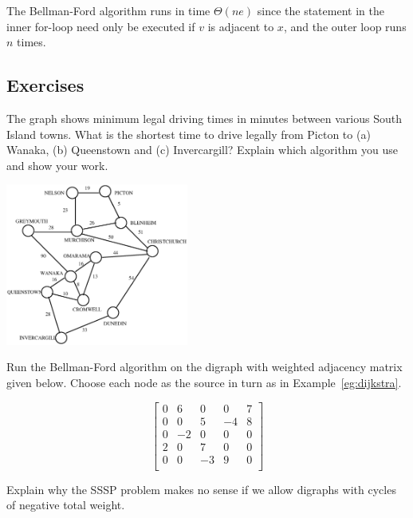 The Bellman-Ford algorithm runs in time $\Theta(ne)$ since the statement in the inner for-loop need only be executed if $v$ is adjacent to $x$, and the outer loop runs $n$ times.


\subsection*{Exercises}

\begin{Exercise}\label{ex:dijk-SI}

The graph shows minimum legal driving times in minutes between various
South Island towns. What is the shortest time to drive legally from
Picton to (a) Wanaka, (b) Queenstown and (c) Invercargill? Explain which
algorithm you use and show your work.
\begin{center}
\includegraphics[width=6cm]{figs/SI.xfg.eps}
\end{center}
\end{Exercise}

\begin{Exercise} 
\label{ex:do-bellford}

Run the Bellman-Ford algorithm on the digraph with weighted adjacency matrix given below. Choose each node as the source in turn as in Example~\ref{eg:dijkstra}.

$$
\left[
\begin{matrix}
0 & 6 & 0 & 0 & 7 \\
0 & 0 & 5 & -4 & 8 \\
0 & -2 & 0 & 0 & 0 \\
2 & 0 & 7 & 0 & 0 \\
0 & 0 & -3 & 9 & 0 \\
\end{matrix}
\right]
$$

\end{Exercise}

\begin{Exercise}\label{ex:SSSP-neg-cycle}

Explain why the SSSP problem makes no sense if we allow digraphs with
cycles of negative total weight.

\end{Exercise}

